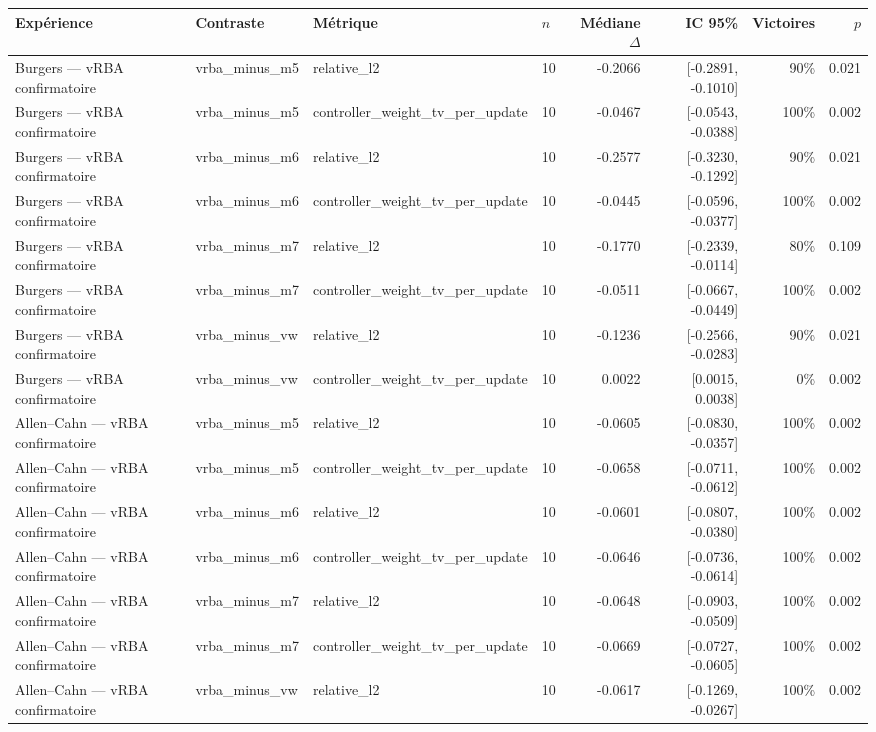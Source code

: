 \begin{tabular}{llllrrrr}
\toprule
Expérience & Contraste & Métrique & $n$ & Médiane $\Delta$ & IC 95\% & Victoires & $p$ \\
\midrule
Burgers — vRBA confirmatoire & vrba\_minus\_m5 & relative\_l2 & 10 & -0.2066 & [-0.2891, -0.1010] & 90\% & 0.021 \\
Burgers — vRBA confirmatoire & vrba\_minus\_m5 & controller\_weight\_tv\_per\_update & 10 & -0.0467 & [-0.0543, -0.0388] & 100\% & 0.002 \\
Burgers — vRBA confirmatoire & vrba\_minus\_m6 & relative\_l2 & 10 & -0.2577 & [-0.3230, -0.1292] & 90\% & 0.021 \\
Burgers — vRBA confirmatoire & vrba\_minus\_m6 & controller\_weight\_tv\_per\_update & 10 & -0.0445 & [-0.0596, -0.0377] & 100\% & 0.002 \\
Burgers — vRBA confirmatoire & vrba\_minus\_m7 & relative\_l2 & 10 & -0.1770 & [-0.2339, -0.0114] & 80\% & 0.109 \\
Burgers — vRBA confirmatoire & vrba\_minus\_m7 & controller\_weight\_tv\_per\_update & 10 & -0.0511 & [-0.0667, -0.0449] & 100\% & 0.002 \\
Burgers — vRBA confirmatoire & vrba\_minus\_vw & relative\_l2 & 10 & -0.1236 & [-0.2566, -0.0283] & 90\% & 0.021 \\
Burgers — vRBA confirmatoire & vrba\_minus\_vw & controller\_weight\_tv\_per\_update & 10 & 0.0022 & [0.0015, 0.0038] & 0\% & 0.002 \\
Allen–Cahn — vRBA confirmatoire & vrba\_minus\_m5 & relative\_l2 & 10 & -0.0605 & [-0.0830, -0.0357] & 100\% & 0.002 \\
Allen–Cahn — vRBA confirmatoire & vrba\_minus\_m5 & controller\_weight\_tv\_per\_update & 10 & -0.0658 & [-0.0711, -0.0612] & 100\% & 0.002 \\
Allen–Cahn — vRBA confirmatoire & vrba\_minus\_m6 & relative\_l2 & 10 & -0.0601 & [-0.0807, -0.0380] & 100\% & 0.002 \\
Allen–Cahn — vRBA confirmatoire & vrba\_minus\_m6 & controller\_weight\_tv\_per\_update & 10 & -0.0646 & [-0.0736, -0.0614] & 100\% & 0.002 \\
Allen–Cahn — vRBA confirmatoire & vrba\_minus\_m7 & relative\_l2 & 10 & -0.0648 & [-0.0903, -0.0509] & 100\% & 0.002 \\
Allen–Cahn — vRBA confirmatoire & vrba\_minus\_m7 & controller\_weight\_tv\_per\_update & 10 & -0.0669 & [-0.0727, -0.0605] & 100\% & 0.002 \\
Allen–Cahn — vRBA confirmatoire & vrba\_minus\_vw & relative\_l2 & 10 & -0.0617 & [-0.1269, -0.0267] & 100\% & 0.002 \\

\end{tabular}
